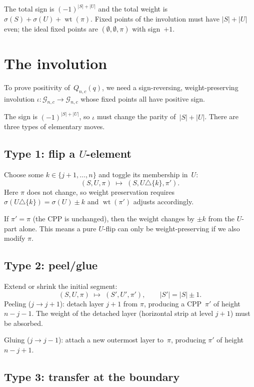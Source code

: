 \documentclass[11pt]{article}
\DeclareMathOperator{\wt}{wt}
\theoremstyle{plain}
\theoremstyle{definition}
\begin{document}
\medskip\noindent
The total sign is $(-1)^{|S|+|U|}$ and the total weight
is $\sigma(S) + \sigma(U) + \wt(\pi)$.  Fixed points of
the involution must have $|S| + |U|$ even; the ideal fixed
points are $(\emptyset, \emptyset, \pi)$ with sign~$+1$.


\section{The involution}
\label{sec:involution}

To prove positivity of~$Q_{n,c}(q)$, we need a
sign-reversing, weight-preserving involution
$\iota \colon \mathcal{G}_{n,c} \to \mathcal{G}_{n,c}$
whose fixed points all have positive sign.

The sign is $(-1)^{|S| + |U|}$, so $\iota$ must change
the parity of~$|S| + |U|$.  There are three types of
elementary moves.

\subsection{Type 1: flip a \texorpdfstring{$U$}{U}-element}

Choose some $k \in \{j+1, \ldots, n\}$ and toggle its
membership in~$U$:
\[
  (S, U, \pi) \;\longmapsto\; (S, U \triangle \{k\}, \pi').
\]
Here $\pi$ does not change, so weight preservation
requires $\sigma(U \triangle \{k\}) = \sigma(U) \pm k$
and $\wt(\pi')$ adjusts accordingly.

If $\pi' = \pi$ (the CPP is unchanged), then the weight
changes by $\pm k$ from the $U$-part alone.  This means a
pure $U$-flip can only be weight-preserving if we also
modify $\pi$.

\subsection{Type 2: peel/glue}

Extend or shrink the initial segment:
\[
  (S, U, \pi) \;\longmapsto\; (S', U', \pi'),
  \qquad |S'| = |S| \pm 1.
\]
Peeling ($j \to j+1$): detach layer $j+1$ from $\pi$,
producing a CPP~$\pi'$ of height~$n - j - 1$.
The weight of the detached layer (horizontal strip at
level $j+1$) must be absorbed.

Gluing ($j \to j-1$): attach a new outermost layer
to~$\pi$, producing $\pi'$ of height $n - j + 1$.

\subsection{Type 3: transfer at the boundary}
\end{document}

